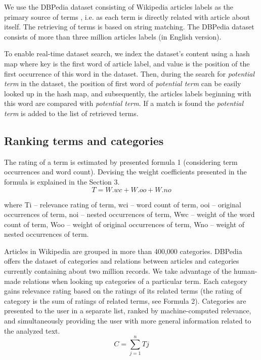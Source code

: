 \documentclass{llncs}%
\begin{document}
We use the DBPedia dataset consisting of Wikipedia articles labels as the primary source of terms \cite{auer2007dbpedia}, i.e. as each term is directly related with article about itself. The retrieving of terms is based on string matching. The DBPedia dataset consists of more than three million articles labels (in English version).  

To enable real-time dataset search, we index the dataset’s content using a hash map where key is the first word of article label, and value is the position of the first occurrence of this word in the dataset. Then, during the search for \textit{potential term} in the dataset, the position of first word of \textit{potential term} can be easily looked up in the hash map, and subsequently, the articles labels beginning with this word are compared with \textit{potential term}. If a match is found the \textit{potential term} is added to the list of retrieved terms. 



\subsection{Ranking terms and categories}

The rating of a term is estimated by presented formula 1 (considering term occurrences and word count). Devising the weight coefficients presented in the formula is explained in the Section 3. 
\begin{equation}
T =	W	.	wc	+	W	.	oo	+	W	.	no
\end{equation}

where Ti – relevance rating of term, wci – word count of term, ooi – original occurrences of term, noi – nested occurrences of term, Wwc – weight of the word count of term, Woo – weight of original occurrences of term, Wno – weight of nested occurrences of term. 

Articles in Wikipedia are grouped in more than 400,000 categories. DBPedia offers the dataset of categories and relations between articles and categories currently containing about two million records. We take advantage of the human-made relations when looking up categories of a particular term. Each category gains relevance rating based on the ratings of its related terms (the rating of category is the sum of ratings of related terms, see Formula 2). Categories are presented to the user in a separate list, ranked by machine-computed relevance, and simultaneously providing the user with more general information related to the analyzed text.
\begin{equation}
C = \sum_{j=1}^{n} Tj
\end{equation}
\end{document}
